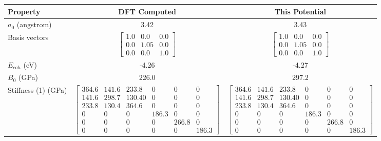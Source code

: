 \begin{table}[ht]
\renewcommand{\arraystretch}{1.2}
\begin{tabular}{lcccccc}
\hline\hline
Property & \multicolumn{3}{c}{DFT Computed} & \multicolumn{3}{c}{This Potential} \\
\hline\hline
$a_0$ (angstrom)         & \multicolumn{3}{c}{3.42}   & \multicolumn{3}{c}{3.43} \\
Basis vectors            & \multicolumn{3}{c}{$\begin{bmatrix} 1.0 & 0.0 & 0.0 \\ 0.0 & 1.05 & 0.0 \\ 0.0 & 0.0 & 1.0  \end{bmatrix}$} & \multicolumn{3}{c}{$\begin{bmatrix} 1.0 & 0.0 & 0.0 \\ 0.0 & 1.05 & 0.0 \\ 0.0 & 0.0 & 1.0  \end{bmatrix}$} \\
$E_{coh}$ (eV)           & \multicolumn{3}{c}{-4.26}  & \multicolumn{3}{c}{-4.27} \\
$B_0$ (GPa)              & \multicolumn{3}{c}{226.0}  & \multicolumn{3}{c}{297.2} \\
Stiffness (1) (GPa) & \multicolumn{3}{c}{$\begin{bmatrix} 364.6 & 141.6 & 233.8 & 0 & 0 & 0 \\ 141.6 & 298.7 & 130.40 & 0 & 0 & 0 \\ 233.8 & 130.4 & 364.6 & 0 & 0 & 0 \\ 0 & 0 & 0 & 186.3 & 0 & 0 \\ 0 & 0 & 0 & 0 & 266.8 & 0 \\ 0 & 0 & 0 & 0 & 0 & 186.3 \end{bmatrix}$}   & \multicolumn{3}{c}{$\begin{bmatrix} 364.6 & 141.6 & 233.8 & 0 & 0 & 0 \\ 141.6 & 298.7 & 130.40 & 0 & 0 & 0 \\ 233.8 & 130.4 & 364.6 & 0 & 0 & 0 \\ 0 & 0 & 0 & 186.3 & 0 & 0 \\ 0 & 0 & 0 & 0 & 266.8 & 0 \\ 0 & 0 & 0 & 0 & 0 & 186.3 \end{bmatrix}$} \\

\end{tabular}
\end{table}
